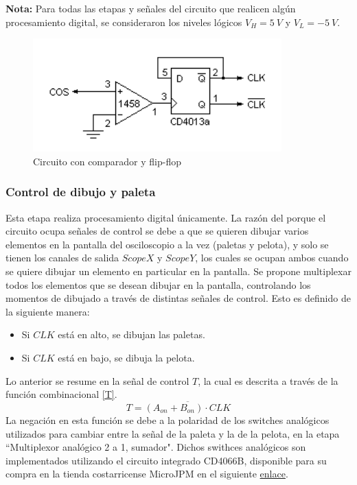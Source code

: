 \textbf{Nota:} Para todas las etapas y señales del circuito que realicen algún procesamiento digital, se consideraron los niveles lógicos $V_H = \SI{5}{V}$ y $V_L = \SI{-5}{V}$.

\begin{figure}[H]
    \centering
    \includegraphics[width=0.5\linewidth]{figs/descripcion/comparadorFF.png}
    \caption{Circuito con comparador y flip-flop \cite{pong}}
    \label{compFF}
\end{figure}

\subsubsection{Control de dibujo y paleta}
Esta etapa realiza procesamiento digital únicamente.
La razón del porque el circuito ocupa señales de control se debe a que se quieren dibujar varios elementos en la pantalla del osciloscopio a la vez (paletas y pelota), y solo se tienen los canales de salida $ScopeX$ y $ScopeY$, los cuales se ocupan ambos cuando se quiere dibujar un elemento en particular en la pantalla. 
Se propone multiplexar todos los elementos que se desean dibujar en la pantalla, controlando los momentos de dibujado a través de distintas señales de control.
Esto es definido de la siguiente manera:
\begin{itemize}
    \item Si $CLK$ está en alto, se dibujan las paletas.
    \item Si $CLK$ está en bajo, se dibuja la pelota. 
\end{itemize}
Lo anterior se resume en la señal de control $T$, la cual es descrita a través de la función combinacional \eqref{T}.
\begin{equation}
    T = \overline{(A_{on} + B_{on})\cdot CLK}\label{T}
\end{equation}
La negación en esta función se debe a la polaridad de los switches analógicos utilizados para cambiar entre la señal de la paleta y la de la pelota, en la etapa ``Multiplexor analógico 2 a 1, sumador".
Dichos swithces analógicos son implementados utilizando el circuito integrado CD4066B, disponible para su compra en la tienda costarricense MicroJPM en el siguiente \href{https://www.microjpm.com/products/cd4066-ic-cmos-quad-bilateral-switch/}{enlace}.

